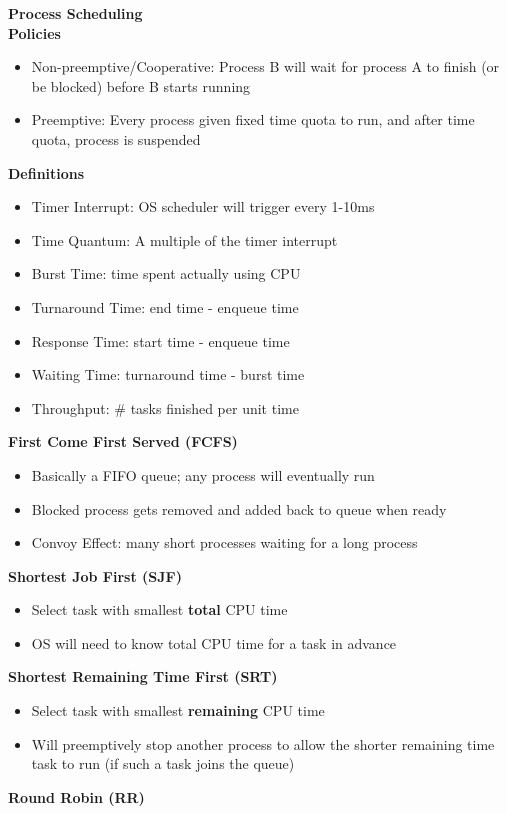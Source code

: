 \documentclass[a4paper, 12pt]{article}
\begin{document}
\begin{multicols*}{3}
\medskip

{\small\textbf{Process Scheduling}} \\
\textbf{Policies}
\begin{itemize}
	\item Non-preemptive/Cooperative: Process B will wait for process A to finish (or be blocked) before B starts running
	\item Preemptive: Every process given fixed time quota to run, and after time quota, process is suspended
\end{itemize}
\textbf{Definitions}
\begin{itemize}
	\item Timer Interrupt: OS scheduler will trigger every 1-10ms
	\item Time Quantum: A multiple of the timer interrupt
	\item Burst Time: time spent actually using CPU
	\item Turnaround Time: end time - enqueue time
	\item Response Time: start time - enqueue time
	\item Waiting Time: turnaround time - burst time
	\item Throughput: \# tasks finished per unit time
\end{itemize}
\textbf{First Come First Served (FCFS)}
\begin{itemize}
	\item Basically a FIFO queue; any process will eventually run
	\item Blocked process gets removed and added back to queue when ready
	\item Convoy Effect: many short processes waiting for a long process
\end{itemize}
\textbf{Shortest Job First (SJF)}
\begin{itemize}
	\item Select task with smallest \textbf{total} CPU time
	\item OS will need to know total CPU time for a task in advance
\end{itemize}
\textbf{Shortest Remaining Time First (SRT)}
\begin{itemize}
	\item Select task with smallest \textbf{remaining} CPU time
	\item Will preemptively stop another process to allow the shorter remaining time task to run (if such a task joins the queue)
\end{itemize}
\textbf{Round Robin (RR)}

\end{multicols*}
\end{document}
